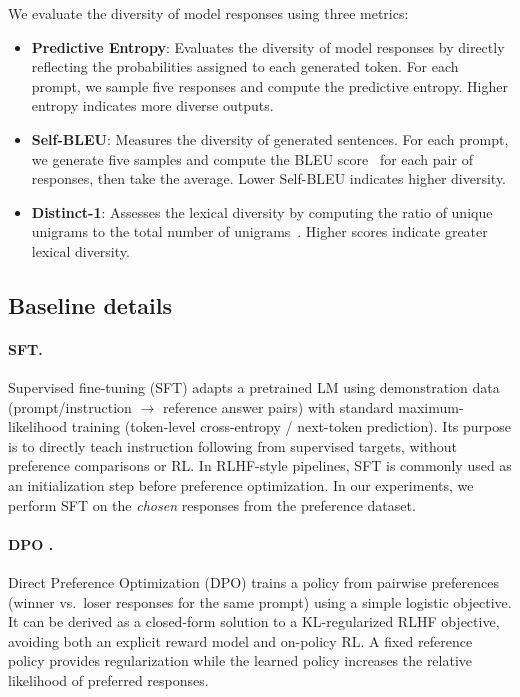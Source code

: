 \documentclass{article}
\theoremstyle{plain}
\theoremstyle{definition}
\theoremstyle{remark}
\begin{document}
We evaluate the diversity of model responses using three metrics:

\begin{itemize}
    \item \textbf{Predictive Entropy}: Evaluates the diversity of model responses by directly reflecting the probabilities assigned to each generated token. For each prompt, we sample five responses and compute the predictive entropy. Higher entropy indicates more diverse outputs.
    
    \item \textbf{Self-BLEU}: Measures the diversity of generated sentences. For each prompt, we generate five samples and compute the BLEU score~\cite{self-bleu} for each pair of responses, then take the average. Lower Self-BLEU indicates higher diversity.
    
    \item \textbf{Distinct-1}: Assesses the lexical diversity by computing the ratio of unique unigrams to the total number of unigrams~\cite{distinct-1}. Higher scores indicate greater lexical diversity.
\end{itemize}


\paragraph{}

\subsection{Baseline details}
\label{app:baselines}
\paragraph{SFT.}
Supervised fine-tuning (SFT) adapts a pretrained LM using demonstration data (prompt/instruction $\rightarrow$ reference answer pairs) with standard maximum-likelihood training (token-level cross-entropy / next-token prediction). Its purpose is to directly teach instruction following from supervised targets, without preference comparisons or RL. In RLHF-style pipelines, SFT is commonly used as an initialization step before preference optimization. In our experiments, we perform SFT on the \emph{chosen} responses from the preference dataset.
\paragraph{DPO \cite{rafailov2023dpo}.}
Direct Preference Optimization (DPO) trains a policy from pairwise preferences (winner vs.\ loser responses for the same prompt) using a simple logistic objective. It can be derived as a closed-form solution to a KL-regularized RLHF objective, avoiding both an explicit reward model and on-policy RL. A fixed reference policy provides regularization while the learned policy increases the relative likelihood of preferred responses.
\end{document}
